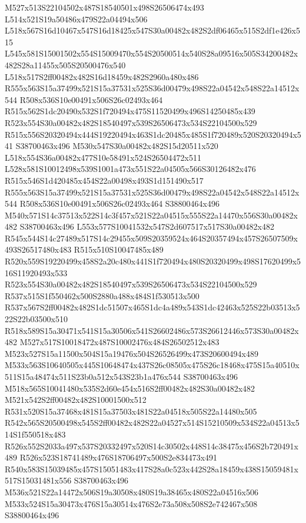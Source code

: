 \documentclass{article}
\begin{document}
\begin{multicols}{2}
M527x513S22104502x487S18540501x498S26506474x493 L514x521S19a50486x479S22a04494x506 L518x567S16d10467x547S16d18425x547S30a00482x482S2df06465x515S2df1e426x515 L545x581S15001502x554S15009470x554S20500514x540S28a09516x505S34200482x482S28a11455x505S20500476x540 L518x517S2ff00482x482S16d18459x482S2960a480x486 R555x563S15a37499x521S15a37531x525S36d00479x498S22a04542x548S22a14512x544 R508x536S10e00491x506S26c02493x464 R515x562S1dc20490x532S1f720494x475S11520499x496S14250485x439 R523x554S30a00482x482S18540497x539S26506473x534S22104500x529 R515x556S20320494x444S19220494x463S1dc20485x485S1f720489x520S20320494x541 S38700463x496 M530x547S30a00482x482S15d20511x520 L518x554S36a00482x477S10e58491x524S26504472x511 L528x581S10012498x539S1001a473x551S22a04505x566S30126482x476 R515x546S1d420485x454S22a00498x493S1d151490x517 R555x563S15a37499x521S15a37531x525S36d00479x498S22a04542x548S22a14512x544 R508x536S10e00491x506S26c02493x464 S38800464x496 M540x571S14c37513x522S14c3f457x521S22a04515x555S22a14470x556S30a00482x482 S38700463x496 L553x577S10041532x547S2d607517x517S30a00482x482 R545x544S14c27489x517S14c29455x509S20359524x464S20357494x457S26507509x493S26517480x483 R515x510S10047485x489 R520x559S19220499x458S2a20c480x441S1f720494x480S20320499x498S17620499x516S11920493x533 R523x554S30a00482x482S18540497x539S26506473x534S22104500x529 R537x515S1f550462x500S2880a488x484S1f530513x500 R537x567S2ff00482x482S1dc51507x465S1dc4a489x543S1dc42463x525S22b03513x522S22b03500x510 R518x589S15a30471x541S15a30506x541S26602486x573S26612446x573S30a00482x482 M527x517S10018472x487S10002476x484S26502512x483 M523x527S15a11500x504S15a19476x504S26526499x473S20600494x489 M533x563S10640505x445S10648474x437S26c08505x475S26c18468x475S15a40510x511S15a48474x511S23b0a512x543S23b1a476x544 S38700463x496 M518x565S10041480x535S2d60e454x516S2ff00482x482S30a00482x482 M521x542S2ff00482x482S10001500x512 R531x520S15a37468x481S15a37503x481S22a04518x505S22a14480x505 R542x565S20500498x545S2ff00482x482S22a04527x514S15210509x534S22a04513x514S1f550518x483 R526x552S2033a497x537S20332497x520S14c30502x448S14c38475x456S2b720491x489 R526x523S18741489x476S18706497x500S2e834473x491 R540x583S15039485x457S15051483x417S28a0c523x442S28a18459x438S15059481x517S15031481x556 S38700463x496 M536x521S22a14472x506S19a30508x480S19a38465x480S22a04516x506 M533x524S15a30473x476S15a30514x476S2e73a508x508S2e742467x508 S38800464x496


\end{multicols}
\end{document}
